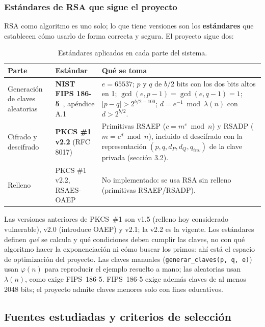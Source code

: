 \subsubsection{Estándares de RSA que sigue el proyecto}

RSA como algoritmo es uno solo; lo que tiene versiones son los
\textbf{estándares} que establecen cómo usarlo de forma correcta y segura. El
proyecto sigue dos:

\begin{table}[H]
\centering\small
\caption{Estándares aplicados en cada parte del sistema.}
\label{tab:estandares}
\begin{tabularx}{\textwidth}{@{}R{3.0cm} R{3.4cm} Y@{}}
\toprule
\textbf{Parte} & \textbf{Estándar} & \textbf{Qué se toma}\\
\midrule
Generación de claves aleatorias & \textbf{NIST FIPS 186-5}~\cite{fips186}, apéndice A.1 & $e = 65537$; $p$ y $q$
de $b/2$ bits con los dos bits altos en 1; $\gcd(e,p-1)=\gcd(e,q-1)=1$;
$|p-q| > 2^{b/2-100}$; $d = e^{-1} \bmod \lambda(n)$ con $d > 2^{b/2}$.\\
Cifrado y descifrado & \textbf{PKCS \#1 v2.2} (RFC 8017)~\cite{rfc8017} & Primitivas RSAEP
($c = m^e \bmod n$) y RSADP ($m = c^d \bmod n$), incluido el descifrado con la
representación $(p, q, d_P, d_Q, q_{inv})$ de la clave privada (sección 3.2).\\
Relleno & PKCS \#1 v2.2, RSAES-OAEP & No implementado: se usa RSA sin relleno (primitivas RSAEP/RSADP).\\
\bottomrule
\end{tabularx}
\end{table}

Las versiones anteriores de PKCS~\#1 son v1.5 (relleno hoy considerado
vulnerable), v2.0 (introduce OAEP) y v2.1; la v2.2 es la vigente. Los
estándares definen \emph{qué} se calcula y qué condiciones deben cumplir las
claves, no con qué algoritmo hacer la exponenciación ni cómo buscar los primos:
ahí está el espacio de optimización del proyecto. Las claves manuales
(\texttt{generar\_claves(p, q, e)}) usan $\varphi(n)$ para reproducir el
ejemplo resuelto a mano; las aleatorias usan $\lambda(n)$, como exige
FIPS~186-5. FIPS~186-5 exige además claves de al menos 2048 bits; el proyecto
admite claves menores solo con fines educativos.

\subsection{Fuentes estudiadas y criterios de selección}

